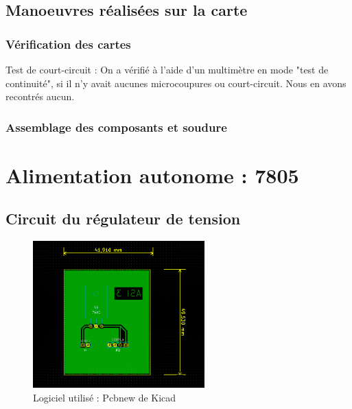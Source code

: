 \subsection{Manoeuvres réalisées sur la carte}
	\subsubsection{Vérification des cartes}
		Test de court-circuit : On a vérifié à l'aide d'un multimètre en mode "test de continuité", si il n'y avait aucunes microcoupures ou court-circuit. Nous en avons recontrés aucun.
	\subsubsection{Assemblage des composants et soudure}


\newpage

\section{Alimentation autonome : 7805}
\subsection{Circuit du régulateur de tension}
\begin{figure}[h]
	\centering
	\includegraphics[width=250px]{images/PCB.png}
	\caption{Logiciel utilisé : Pcbnew de Kicad}
\end{figure}

